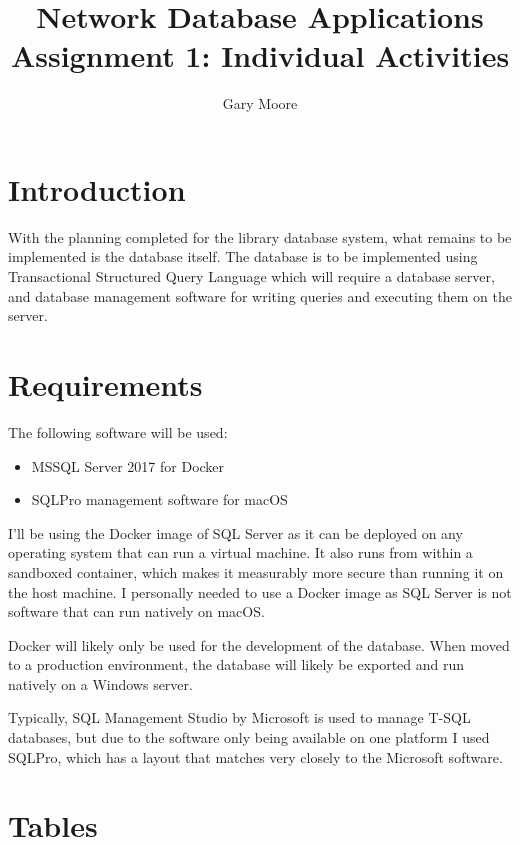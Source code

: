 \documentclass[11pt,a4paper]{scrartcl}
\author{Gary Moore}
\title{Network Database Applications Assignment 1: Individual Activities}
\begin{document}
	\maketitle
	
	\section{Introduction}\label{introduction}
	
	With the planning completed for the library database system, what remains to be implemented is the database itself. The database is to be implemented using Transactional Structured Query Language which will require a database server, and database management software for writing queries and executing them on the server.
	
	\section{Requirements}\label{requirements}
	
	The following software will be used:
	
	\begin{itemize}
		\item MSSQL Server 2017 for Docker
		\item SQLPro management software for macOS
	\end{itemize}
	
	I’ll be using the Docker image of SQL Server  as it can be deployed on any operating system that can run a virtual machine. It also runs from within a sandboxed container, which makes it measurably more secure than running it on the host machine. I personally needed to use a Docker image as SQL Server is not software that can run natively on macOS.
	
	Docker will likely only be used for the development of the database. When moved to a production environment, the database will likely be exported and run natively on a Windows server.
	
	Typically, SQL Management Studio by Microsoft is used to manage T-SQL databases, but due to the software only being available on one platform I used SQLPro, which has a layout that matches very closely to the Microsoft software.
	
	\section{Tables}\label{sql requirements}
	
\end{document}
